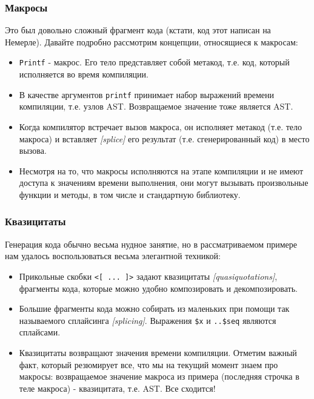 \documentclass{beamer}
\begin{document}
\begin{frame}[t]
\frametitle{Макросы}

Это был довольно сложный фрагмент кода (кстати, код этот написан на Немерле). Давайте подробно рассмотрим концепции, относящиеся к макросам:

\begin{itemize}
\item \texttt{Printf} - макрос. Его тело представляет собой метакод, т.е. код, который исполняется во время компиляции.
\item В качестве аргументов \texttt{printf} принимает набор выражений времени компиляции, т.е. узлов AST. Возвращаемое значение тоже является AST.
\item Когда компилятор встречает вызов макроса, он исполняет метакод (т.е. тело макроса) и вставляет \emph{[splice]} его результат (т.е. сгенерированный код) в место вызова.
\item Несмотря на то, что макросы исполняются на этапе компиляции и не имеют доступа к значениям времени выполнения, они могут вызывать произвольные функции и методы, в том числе и стандартную библиотеку.
\end{itemize}
\end{frame}

\begin{frame}[t]
\frametitle{Квазицитаты}

Генерация кода обычно весьма нудное занятие, но в рассматриваемом примере нам удалось воспользоваться весьма элегантной техникой:

\begin{itemize}
\item Прикольные скобки \texttt{<[ ... ]>} задают квазицитаты \emph{[quasiquotations]}, фрагменты кода, которые можно удобно композировать и декомпозировать.
\item Большие фрагменты кода можно собирать из маленьких при помощи так называемого сплайсинга \emph{[splicing]}. Выражения \texttt{\$x} и \texttt{..\$seq} являются сплайсами.
\item Квазицитаты возвращают значения времени компиляции. Отметим важный факт, который резюмирует все, что мы на текущий момент знаем про макросы: возвращаемое значение макроса из примера (последняя строчка в теле макроса) - квазицитата, т.е. AST. Все сходится!
\end{itemize}
\end{frame}
\end{document}
